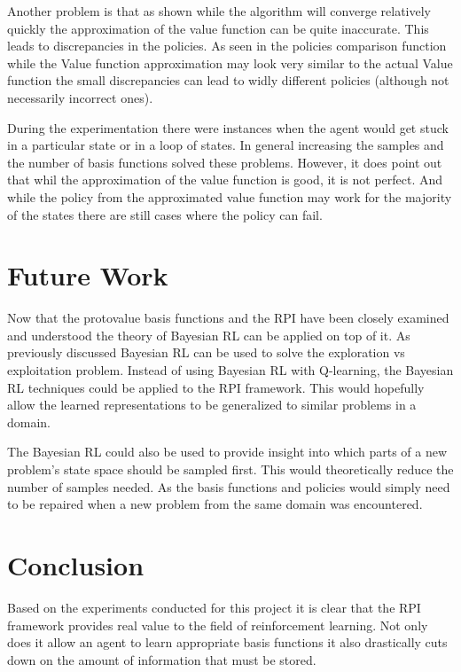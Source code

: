 \documentclass[12pt, letterpaper, final]{report}
\begin{document}
Another problem is that as shown while the algorithm will converge
relatively quickly the approximation of the value function can be
quite inaccurate. This leads to discrepancies in the policies. As seen
in the policies comparison function while the Value function
approximation may look very similar to the actual Value function the
small discrepancies can lead to widly different policies (although not
necessarily incorrect ones). 

During the experimentation there were
instances when the agent would get stuck in a particular state or in a
loop of states. In general increasing the samples and the number of
basis functions solved these problems. However, it does point out that
whil the approximation of the value function is good, it is not
perfect. And while the policy from the approximated value function may
work for the majority of the states there are still cases where the
policy can fail.

\section{Future Work}

Now that the protovalue basis functions and the RPI have been closely
examined and understood the theory of Bayesian RL can be applied on
top of it. As previously discussed Bayesian RL can be used to solve
the exploration vs exploitation problem. Instead of using Bayesian RL
with Q-learning, the Bayesian RL techniques could be applied to the
RPI framework. This would hopefully allow the learned representations
to be generalized to similar problems in a domain. 

The Bayesian RL could also be used to provide insight into which parts
of a new problem's state space should be sampled first. This would
theoretically reduce the number of samples needed. As the basis
functions and policies would simply need to be repaired when a new
problem from the same domain was encountered.

\section{Conclusion}

Based on the experiments conducted for this project it is clear that
the RPI framework provides real value to the field of reinforcement
learning. Not only does it allow an agent to learn appropriate basis
functions it also drastically cuts down on the amount of information
that must be stored.
\end{document}

